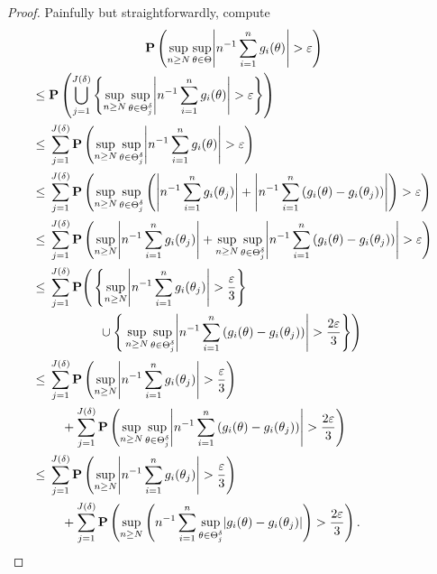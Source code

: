 \documentclass[11pt,letterpaper,reqno,oneside]{article}
\begin{document}
\begin{proof}
	Painfully but straightforwardly, compute
	\begin{multline*}
		\PP\left(
		\sup_{n \geq N}
		\sup_{\theta \in \Theta} 
		\abs*{ n^{-1} \sum_{i=1}^n g_i(\theta) }
		> \eps \right)
		\\
		\begin{aligned}
			\leq{}&
			\PP\left(
			\Union_{j=1}^{J(\delta)}
			\left\{ \sup_{n \geq N}
			\sup_{\theta \in \Theta^\delta_j} 
			\abs*{ n^{-1} \sum_{i=1}^n g_i(\theta) }
			> \eps \right\} \right)
			\\
			\leq{}&
			\sum_{j=1}^{J(\delta)}
			\PP\left(
			\sup_{n \geq N}
			\sup_{\theta \in \Theta^\delta_j} 
			\abs*{ n^{-1} \sum_{i=1}^n g_i(\theta) }
			> \eps \right) 
			\\
			\leq{}&
			\sum_{j=1}^{J(\delta)}
			\PP\left(
			\sup_{n \geq N}
			\sup_{\theta \in \Theta^\delta_j} 
			\Bigg(
			\abs*{ n^{-1} \sum_{i=1}^n g_i(\theta_j) }
			+ \abs*{ n^{-1} \sum_{i=1}^n \left( g_i(\theta) - g_i(\theta_j) \right) }
			\Bigg)
			> \eps \right) 
			\\
			\leq{}&
			\sum_{j=1}^{J(\delta)}
			\PP\left(
			\sup_{n \geq N}
			\abs*{ n^{-1} \sum_{i=1}^n g_i(\theta_j) }
			+ \sup_{n \geq N}
			\sup_{\theta \in \Theta^\delta_j} 
			\abs*{ n^{-1} \sum_{i=1}^n \left( g_i(\theta) - g_i(\theta_j) \right) }
			> \eps \right) 
			\\
			\leq{}&
			\sum_{j=1}^{J(\delta)}
			\PP\Bigg(
			\left\{
			\sup_{n \geq N}
			\abs*{ n^{-1} \sum_{i=1}^n g_i(\theta_j) }
			> \frac{\eps}{3} \right\}
			\\
			&\quad\quad\quad\quad
			\union
			\Bigg\{
			\sup_{n \geq N}
			\sup_{\theta \in \Theta^\delta_j} 
			\abs*{ n^{-1} \sum_{i=1}^n \left( g_i(\theta) - g_i(\theta_j) \right) }
			> \frac{2\eps}{3} \Bigg\}
			\Bigg) 
			\\
			\leq{}&
			\sum_{j=1}^{J(\delta)}
			\PP\left(
			\sup_{n \geq N}
			\abs*{ n^{-1} \sum_{i=1}^n g_i(\theta_j) }
			> \frac{\eps}{3}
			\right)
			\\
			&\quad
			+ \sum_{j=1}^{J(\delta)} \PP\left(
			\sup_{n \geq N}
			\sup_{\theta \in \Theta^\delta_j} 
			\abs*{ n^{-1} \sum_{i=1}^n \left( g_i(\theta) - g_i(\theta_j) \right) }
			> \frac{2\eps}{3}
			\right)
			\\
			\leq{}&
			\sum_{j=1}^{J(\delta)}
			\PP\left(
			\sup_{n \geq N}
			\abs*{ n^{-1} \sum_{i=1}^n g_i(\theta_j) }
			> \frac{\eps}{3}
			\right)
			\\
			&\quad
			+ \sum_{j=1}^{J(\delta)} \PP\left(
			\sup_{n \geq N}
			\left(
			n^{-1} \sum_{i=1}^n \sup_{\theta \in \Theta^\delta_j} 
			\abs*{ g_i(\theta) - g_i(\theta_j) }
			\right)
			> \frac{2\eps}{3}
			\right) . 
		\end{aligned}
	\end{multline*}



\end{proof}
\end{document}
